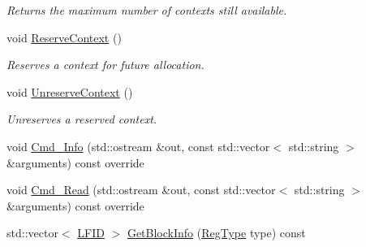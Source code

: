 \begin{DoxyCompactItemize}
\begin{DoxyCompactList}\small\item\em Returns the maximum number of contexts still available. \end{DoxyCompactList}\item 
void \hyperlink{class_simulator_1_1drisc_1_1_r_a_unit_ad2c6e2610c782925f7525e145fd1f3a3}{Reserve\+Context} ()
\begin{DoxyCompactList}\small\item\em Reserves a context for future allocation. \end{DoxyCompactList}\item 
void \hyperlink{class_simulator_1_1drisc_1_1_r_a_unit_a64dc874e33743c25f0948a50d33b77e3}{Unreserve\+Context} ()
\begin{DoxyCompactList}\small\item\em Unreserves a reserved context. \end{DoxyCompactList}\item 
void \hyperlink{class_simulator_1_1drisc_1_1_r_a_unit_a7c8481d4829a30c6761f3596ef8f9c92}{Cmd\+\_\+\+Info} (std\+::ostream \&out, const std\+::vector$<$ std\+::string $>$ \&arguments) const override
\item 
void \hyperlink{class_simulator_1_1drisc_1_1_r_a_unit_abdee8c221cc3f0130f415eb5077133db}{Cmd\+\_\+\+Read} (std\+::ostream \&out, const std\+::vector$<$ std\+::string $>$ \&arguments) const override
\item 
std\+::vector$<$ \hyperlink{namespace_simulator_aaccbc706b2d6c99085f52f6dfc2333e4}{L\+F\+I\+D} $>$ \hyperlink{class_simulator_1_1drisc_1_1_r_a_unit_a9e6a938d7009c5c05bbd543768c60378}{Get\+Block\+Info} (\hyperlink{namespace_simulator_ab86b74f4b95732ea63178d829b189acb}{Reg\+Type} type) const 
\end{DoxyCompactItemize}



